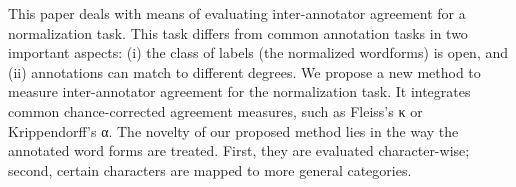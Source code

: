 This paper deals with means of evaluating inter-annotator agreement for a normalization task. This task differs from common annotation tasks in two important aspects: (i) the class of labels (the normalized wordforms) is open, and (ii) annotations can match to different degrees. We propose a new method to measure inter-annotator agreement for the normalization task. It integrates common chance-corrected agreement measures, such as Fleiss's κ or Krippendorff's α. The novelty of our proposed method lies in the way the annotated word forms are treated. First, they are evaluated character-wise; second, certain characters are mapped to more general categories.
